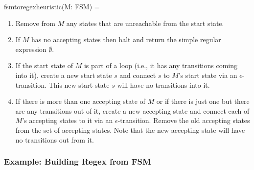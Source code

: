 \documentclass{article}
\begin{document}
fsmtoregexheuristic(M: FSM) =
\begin{enumerate}
  \item Remove from $M$ any states that are unreachable from the start state.

  \item If $M$ has no accepting states then halt and return the simple
  regular expression $\emptyset$.
  
  \item If the start state of $M$ is part of a loop (i.e., it has any
  transitions coming into it), create a new start state $s$
  and connect $s$ to $M$’s start state via an
  $\epsilon$-transition. This new start state $s$ will have
  no transitions into it.
  
  \item If there is more than one accepting state of $M$ or if there is
		  just one but there are any transitions out of it,
		  create a new accepting state and connect each
		  of $M$’s accepting states to it via an
		  $\epsilon$-transition. Remove the old accepting states
		  from the set of accepting states. Note that the
		  new accepting state will have no transitions
		  out from it.
\end{enumerate}

\subsubsection{Example: Building Regex from FSM}
\end{document}
